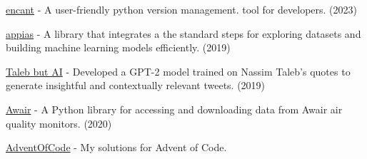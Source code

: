 \begin{cventries}
\vspace{-\baselineskip}

\cventry{}{}{}{}
{
    \begin{cvitems}
    \item \href{https://github.com/aglove2189/encant}{\faLink\acvHeaderIconSep encant}{ - A user-friendly python version management. tool for developers. (2023)}
    \item \href{https://github.com/aglove2189/appias}{\faLink\acvHeaderIconSep appias}{ - A library that integrates a the standard steps for exploring datasets and building machine learning models efficiently. (2019)}
    \item \href{https://twitter.com/taleb_gpt2}{\faTwitter\acvHeaderIconSep Taleb but AI}{ - Developed a GPT-2 model trained on Nassim Taleb's quotes to generate insightful and contextually relevant tweets. (2019)}
    \item \href{https://github.com/aglove2189/awair}{\faLink\acvHeaderIconSep Awair}{ - A Python library for accessing and downloading data from Awair air quality monitors. (2020)}
    \item \href{https://github.com/aglove2189/AdventOfCode}{\faLink\acvHeaderIconSep AdventOfCode}{ - My solutions for Advent of Code.}
    \end{cvitems}
}

\end{cventries}